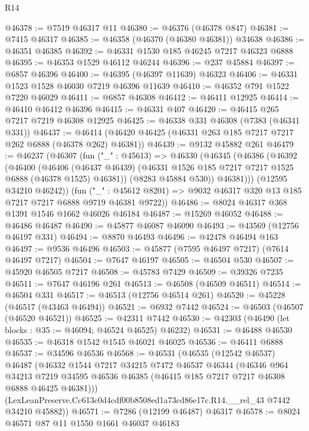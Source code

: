 \begin{lexlean}{R14}
\begin{coremodule}
@46378 := @7519 @46317 @11
@46380 := @46376 (@46378 @847)
@46381 := @7415 @46317
@46385 := @46358 (@46370 (@46380 @46381)) @34638
@46386 := @46351 @46385
@46392 := @46331 @1530 @185 @46245 @7217 @46323 @6888
@46395 := @46353 @1529 @46112 @46244
@46396 := @237 @45884
@46397 := @6857 @46396
@46400 := @46395 (@46397 @11639) @46323
@46406 := @46331 @1523 @1528 @46030 @7219 @46396 @11639
@46410 := @46352 @791 @1522 @7220 @46029
@46411 := @6857 @46308
@46412 := @46411 @12925
@46414 := @46410 @46412 @46396
@46415 := @46331 @407
@46420 := @46415 @265 @7217 @7219 @46308 @12925
@46425 := @46338 @331 @46308 (@7383 (@46341 @331))
@46437 := @46414 (@46420 @46425 (@46331 @263 @185 @7217 @7217 @262 @6888 (@46378 @262) @46381))
@46439 := @9132 @45882 @261
@46479 := @46237
    (@46307
      (fun ("_" : @45613) =>
      @46330
        (@46345
          (@46386
            (@46392
              (@46400
                (@46406
                  (@46437 @46439)
                  (@46331 @1526 @185 @7217 @7217 @1525 @6888 (@46378 @1525) @46381))
                (@8283 @45884 @530))
              @46381)))
        (@12595 @34210 @46242))
      (fun ("_" : @45612 @8201) => @9032 @46317 @320 @13 @185 @7217 @7217 @6888 @9719 @46381 @9722))
@46486 := @8024 @46317 @368 @1391 @1546 @1662 @46026 @46184
@46487 := @15269 @46052
@46488 := @46486 @46487
@46490 := @45877 @46087 @46090
@46493 := @43569 (@12756 @46197 @331)
@46494 := @8870 @46493
@46496 := @42478 @46494 @163
@46497 := @9536 @46496
@46503 := @45877 (@7595 @46497 @7217) (@7614 @46497 @7217)
@46504 := @7647 @46197
@46505 := @46504 @530
@46507 := @45920 @46505 @7217
@46508 := @45783 @7429
@46509 := @39326 @7235
@46511 := @7647 @46196 @261
@46513 := @46508 (@46509 @46511)
@46514 := @46504 @331
@46517 := @46513 (@12756 @46514 @261)
@46520 := @45228 (@46517 (@43463 @46494))
@46521 := @6932 @7442
@46524 := @46503 (@46507 (@46520 @46521))
@46525 := @42311 @7442
@46530 := @42303 (@46490 (let blocks : @35 := @46094; @46524 @46525) @46232)
@46531 := @46488 @46530
@46535 := @46318 @1542 @1545 @46021 @46025
@46536 := @46411 @6888
@46537 := @34596 @46536
@46568 := @46531
    (@46535
      (@12542 @46537)
      @46487
      (@46332
        @1544
        @7217
        @34215
        @7472
        @46537
        @46344
        (@46346
          @964
          @34213
          @7219
          @34595
          @46536
          @46385
          (@46415 @185 @7217 @7217 @46308 @6888 @46425 @46381)))
      (LexLeanPreserve.Cc613c0d4cdf00b8508ed1a73cd86e17c.R14.__rel_43 @7442 @34210 @45882))
@46571 := @7286 (@12199 @46487) @46317
@46578 := @8024 @46571 @87 @11 @1550 @1661 @46037 @46183

\end{coremodule}
\end{lexlean}
